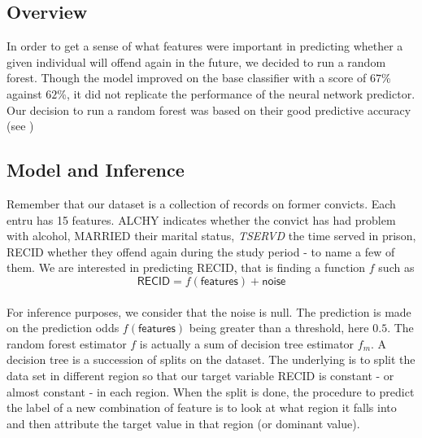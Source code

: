 \documentclass[a4paper]{article}
\theoremstyle{plain}
\begin{document}
\subsection{Overview}

In order to get a sense of what features were important in predicting whether a given individual will offend again in the future, we decided to run a random forest. Though the model improved on the base classifier with a score of $67$\% against $62$\%, it did not replicate the performance of the neural network predictor. Our decision to run a random forest was based on their good predictive accuracy (see \cite{caruana2006empirical})

\subsection{Model and Inference}

Remember that our dataset is a collection of records on former convicts. Each entru has 15 features. \textsf{ALCHY} indicates whether the convict has had problem with alcohol, \textsf{MARRIED} their marital status, \textsl{TSERVD} the time served in prison, \textsf{RECID} whether they offend again during the study period - to name a few of them. We are interested in predicting \textsf{RECID}, that is finding a function $f$ such as
$$ \mathsf{RECID} = f(\mathsf{features}) + \mathsf{noise}$$

\paragraph{}
For inference purposes, we consider that the noise is null. The prediction is made on the prediction odds $f(\mathsf{features})$ being greater than a threshold, here $0.5$. The random forest estimator $f$ is actually a sum of decision tree estimator $f_m$. A decision tree is a succession of splits on the dataset. The underlying is to split the data set in different region so that our target variable \textsf{RECID} is constant - or almost constant - in each region. When the split is done, the procedure to predict the label of a new combination of feature is to look at what region it falls into and then attribute the target value in that region (or dominant value).
\end{document}
